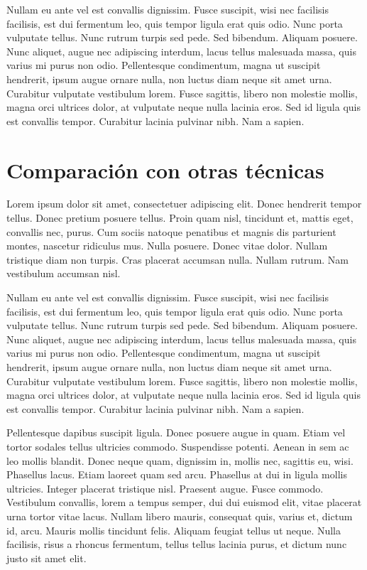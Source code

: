 Nullam eu ante vel est convallis dignissim.  Fusce suscipit, wisi nec
facilisis facilisis, est dui fermentum leo, quis tempor ligula erat
quis odio.  Nunc porta vulputate tellus.  Nunc rutrum turpis sed pede.
Sed bibendum.  Aliquam posuere.  Nunc aliquet, augue nec adipiscing
interdum, lacus tellus malesuada massa, quis varius mi purus non odio.
Pellentesque condimentum, magna ut suscipit hendrerit, ipsum augue
ornare nulla, non luctus diam neque sit amet urna.  Curabitur
vulputate vestibulum lorem.  Fusce sagittis, libero non molestie
mollis, magna orci ultrices dolor, at vulputate neque nulla lacinia
eros.  Sed id ligula quis est convallis tempor.  Curabitur lacinia
pulvinar nibh.  Nam a sapien.

\section{Comparación con otras técnicas}

Lorem ipsum dolor sit amet, consectetuer adipiscing elit.  Donec
hendrerit tempor tellus.  Donec pretium posuere tellus.  Proin quam
nisl, tincidunt et, mattis eget, convallis nec, purus.  Cum sociis
natoque penatibus et magnis dis parturient montes, nascetur ridiculus
mus.  Nulla posuere.  Donec vitae dolor.  Nullam tristique diam non
turpis.  Cras placerat accumsan nulla.  Nullam rutrum.  Nam vestibulum
accumsan nisl.

Nullam eu ante vel est convallis dignissim.  Fusce suscipit, wisi nec
facilisis facilisis, est dui fermentum leo, quis tempor ligula erat
quis odio.  Nunc porta vulputate tellus.  Nunc rutrum turpis sed pede.
Sed bibendum.  Aliquam posuere.  Nunc aliquet, augue nec adipiscing
interdum, lacus tellus malesuada massa, quis varius mi purus non odio.
Pellentesque condimentum, magna ut suscipit hendrerit, ipsum augue
ornare nulla, non luctus diam neque sit amet urna.  Curabitur
vulputate vestibulum lorem.  Fusce sagittis, libero non molestie
mollis, magna orci ultrices dolor, at vulputate neque nulla lacinia
eros.  Sed id ligula quis est convallis tempor.  Curabitur lacinia
pulvinar nibh.  Nam a sapien.

Pellentesque dapibus suscipit ligula.  Donec posuere augue in quam.
Etiam vel tortor sodales tellus ultricies commodo.  Suspendisse
potenti.  Aenean in sem ac leo mollis blandit.  Donec neque quam,
dignissim in, mollis nec, sagittis eu, wisi.  Phasellus lacus.  Etiam
laoreet quam sed arcu.  Phasellus at dui in ligula mollis ultricies.
Integer placerat tristique nisl.  Praesent augue.  Fusce commodo.
Vestibulum convallis, lorem a tempus semper, dui dui euismod elit,
vitae placerat urna tortor vitae lacus.  Nullam libero mauris,
consequat quis, varius et, dictum id, arcu.  Mauris mollis tincidunt
felis.  Aliquam feugiat tellus ut neque.  Nulla facilisis, risus a
rhoncus fermentum, tellus tellus lacinia purus, et dictum nunc justo
sit amet elit.


